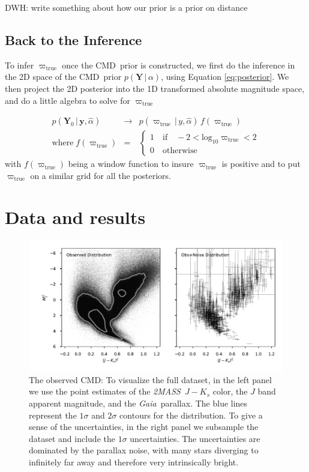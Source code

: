 \documentclass[modern]{aastex61}
\newcommand{\acronym}[1]{{\small{#1}}}
\newcommand{\project}[1]{\textsl{#1}}
\newcommand{\tmass}{\project{\acronym{2MASS}}}
\newcommand{\gaia}{\project{Gaia}}
\newcommand{\cmd}{\acronym{CMD}}
\newcommand{\given}{\,|\,}
\newcommand{\true}{\mathrm{true}}
\renewcommand{\vec}[1]{\boldsymbol{{#1}}}
\newcommand{\truth}{\vec{Y}}
\newcommand{\data}{\vec{y}}
\begin{document}
DWH: write something about how our prior is a prior on distance

\subsection{Back to the Inference}

To infer $\varpi_{\true}$ once the \cmd\ prior is constructed, we first do the inference in the 2D space of the \cmd\ prior $p(\truth \given \alpha)$, using Equation \ref{eq:posterior}. We then project the 2D posterior into the 1D transformed absolute magnitude space, and do a little algebra to solve for $\varpi_{\true}$

\begin{eqnarray}
p(\truth_0 \given \data, \hat{\alpha}) &\rightarrow& p(\varpi_{\true} \given y, \hat{\alpha}) \, f(\varpi_{\true}) \\
\mathrm{where} \; f(\varpi_{\true}) &=& \begin{cases}
              1 \quad \mathrm{if} \quad -2 < \mathrm{log}_{10} \varpi_{\true} < 2\\
              0 \quad \mathrm{otherwise}
              \end{cases}
\label{eq:parallaxPost}
\end{eqnarray}
with $f(\varpi_{\true})$ being a window function to insure $\varpi_{\true}$ is positive and to put $\varpi_{\true}$ on a similar grid for all the posteriors.

\section{Data and results}
\begin{figure}
\centering
  \includegraphics[width=\textwidth]{data.pdf}
\caption{The observed \cmd: To visualize the full dataset, in the left panel we use the point estimates of the \tmass\ $J-K_s$ color, the $J$ band apparent magnitude, and the \gaia\ parallax. The blue lines represent the $1\sigma$ and $2\sigma$ contours for the distribution. To give a sense of the uncertainties, in the right panel we subsample the dataset and include the $1\sigma$ uncertainties. The uncertainties are dominated by the parallax noise, with many stars diverging to infinitely far away and therefore very intrinsically bright.}
\label{fig:data}
\end{figure}
\end{document}
